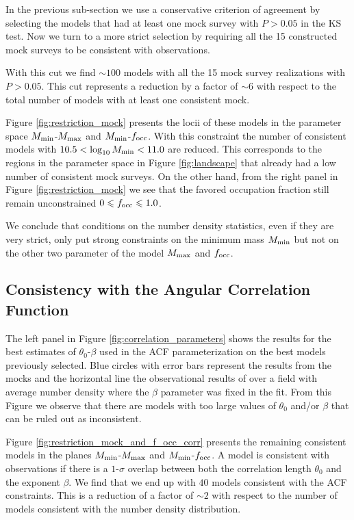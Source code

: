 \documentclass[usenatbib]{mn2e}
\begin{document}
In the previous sub-section we use a conservative criterion of
agreement by selecting the models that had at least one mock survey
with $P>0.05$ in the KS test. Now we turn to a more strict selection
by requiring all the 15 constructed mock surveys to be consistent with
observations. 


With this cut we find $\sim 100$ models with all the 15 mock survey
realizations with $P>0.05$.  This cut represents a reduction by a
factor of $\sim 6$ with respect to the total number of models with at
least one consistent mock.

Figure \ref{fig:restriction_mock} presents the locii of these models
in the parameter space $M_{\rm min}$-$M_{\rm max}$ and $M_{\rm
  min}$-$f_{\rm occ}$. With this constraint the number of consistent
models with  $10.5 < \log_{10}M_{\rm min}< 11.0$ are reduced. This 
corresponds to the regions in the parameter space in
Figure \ref{fig:landscape} that already had a low number of 
consistent mock surveys. On the other hand, from the right panel in
Figure \ref{fig:restriction_mock} we see that the favored occupation
fraction  still remain unconstrained $0\leq f_{\rm  occ}\leq 1.0$. 

We conclude that conditions on the number density statistics, even if they are
very strict, only put strong constraints on the minimum mass $M_{\rm
  min}$ but not on the other two parameter of the model $M_{\rm max}$
and $f_{\rm occ}$. 



\subsection{Consistency with the Angular Correlation Function}



The left panel in Figure \ref{fig:correlation_parameters} shows the
results for the best estimates of $\theta_{0}$-$\beta$  used in the
ACF parameterization on the best models previously selected.  Blue
circles with error bars represent the results from the mocks and the
horizontal line the observational results of \cite{Ouchi2008} over a
field with average number density where the $\beta$ parameter was
fixed in the fit. From this Figure we observe that there are models
with too large values of $\theta_0$ and/or $\beta$ that can be ruled
out as inconsistent.


Figure \ref{fig:restriction_mock_and_f_occ_corr} presents the
remaining consistent models in the planes $M_{\rm min}$-$M_{\rm
  max}$ and $M_{\rm   min}$-$f_{\rm occ}$. A model is consistent with
observations if there is a $1$-$\sigma$ overlap between both the
correlation length $\theta_0$ and the exponent $\beta$.  We find that
we end up with $40$ models consistent with the ACF constraints.  This
is a reduction of a factor of $\sim 2$ with respect to the number of
models consistent with the number density distribution.
\end{document}
